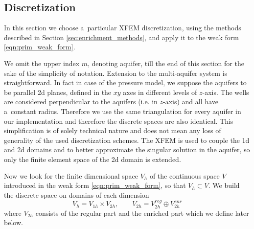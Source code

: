 \subsection{Discretization}
\label{sec:prim_discretization}
In this section we choose a~particular XFEM discretization, using the methods described in Section \ref{sec:enrichment_methods},
and apply it to the weak form \eqref{eqn:prim_weak_form}.

We omit the upper index $m$, denoting aquifer, till the end of this section for the sake of the simplicity of notation.
Extension to the multi-aquifer system is straightforward. In fact in case of the pressure model, we suppose the aquifers
to be parallel 2d planes, defined in the $xy$ axes in different levels of $z$-axis. 
The wells are considered perpendicular to the aquifers (i.e. in $z$-axis) and all have a~constant radius.
Therefore we use the same triangulation for every aquifer in our implementation and therefore the discrete spaces are also identical.
This simplification is of solely technical nature and does not mean any loss of generality of the used discretization schemes.
The XFEM is used to couple the 1d and 2d domains and to better approximate the singular solution in the aquifer,
so only the finite element space of the 2d domain is extended.

Now we look for the finite dimensional space $V_h$ of the continuous space $V$ introduced in the weak form \eqref{eqn:prim_weak_form},
so that $V_h\subset V$. We build the discrete space on domains of each dimension
\begin{equation}
    V_h = V_{1h} \times V_{2h}, \qquad V_{2h} = V_{2h}^{reg} \oplus V_{2h}^{enr}
\end{equation}
where $V_{2h}$ consists of the regular part and the enriched part which we define later below.

